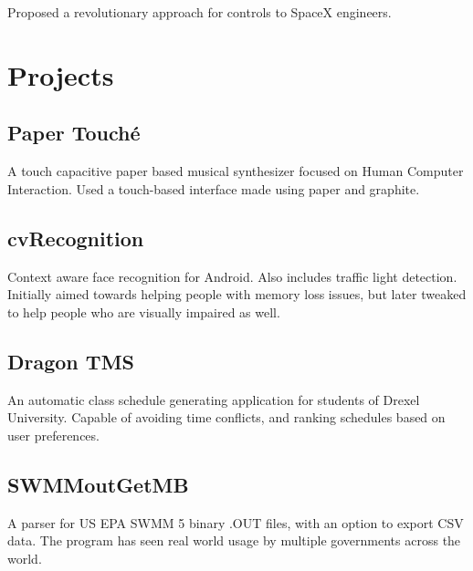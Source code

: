 \documentclass[]{deedy}
\begin{document}
\begin{minipage}[t]{0.66\textwidth}
Proposed a revolutionary approach for controls to SpaceX engineers.
\sectionsep


\section{Projects}
\subsection{Paper Touché}
A touch capacitive paper based musical synthesizer focused on
Human Computer Interaction. Used a touch-based interface made using
paper and graphite.
\sectionsep

\subsection{cvRecognition}
Context aware face recognition for Android. Also includes traffic light detection.
Initially aimed towards helping people with memory loss issues, but later tweaked
to help people who are visually impaired as well.
\sectionsep

\subsection{Dragon TMS}
An automatic class schedule generating application for students of Drexel University.
Capable of avoiding time conflicts, and ranking schedules based on user preferences.
\sectionsep

\subsection{SWMMoutGetMB}
A parser for US EPA SWMM 5 binary .OUT files, with an option to export CSV data.
The program has seen real world usage by multiple governments across the world.
\sectionsep

\end{minipage} 
\end{document}
